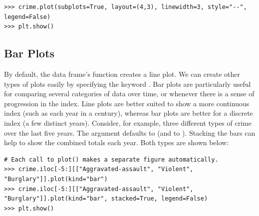 \begin{lstlisting}
>>> crime.plot(subplots=True, layout=(4,3), linewidth=3, style="--", legend=False)
>>> plt.show()
\end{lstlisting}

\subsection*{Bar Plots}

By default, the data frame's  function creates a line plot.
We can create other types of plots easily by specifying the keyword .
Bar plots are particularly useful for comparing several categories of data over time, or whenever there is a sense of progression in the index.
Line plots are better suited to show a more continuous index (such as each year in a century), whereas bar plots are better for a discrete index (a few distinct years).
Consider, for example, three different types of crime over the last five years. The argument  defaults to  (and  to ).  Stacking the bars can help to show the combined totals each year.  Both types are shown below:

\begin{lstlisting}
# Each call to plot() makes a separate figure automatically.
>>> crime.iloc[-5:][["Aggravated-assault", "Violent", "Burglary"]].plot(kind="bar")
>>> crime.iloc[-5:][["Aggravated-assault", "Violent", "Burglary"]].plot(kind="bar", stacked=True, legend=False)
>>> plt.show()
\end{lstlisting}


